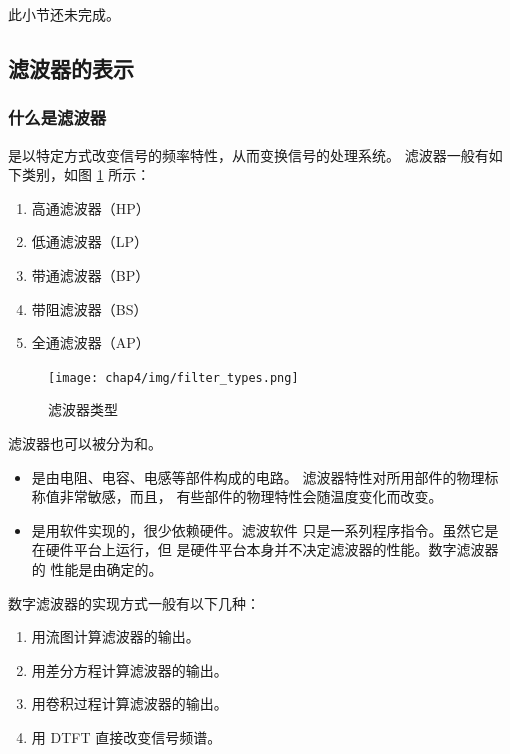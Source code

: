 \begin{note}
    此小节还未完成。
\end{note}

\subsection{滤波器的表示}

\subsubsection{什么是滤波器}

\begin{definition}
    是以特定方式改变信号的频率特性，从而变换信号的处理系统。
    滤波器一般有如下类别，如图 \ref{fig:filter-types} 所示：
    \begin{enumerate}[label=(\arabic*)]
        \item 高通滤波器（HP）
        \item 低通滤波器（LP）
        \item 带通滤波器（BP）
        \item 带阻滤波器（BS）
        \item 全通滤波器（AP）
    \end{enumerate}
    \begin{figure}[H]
        \centering
        \texttt{[image: chap4/img/filter\_types.png]}
        \caption{滤波器类型}
        \label{fig:filter-types}
    \end{figure}

    滤波器也可以被分为和。
    \begin{itemize}
        \item {}是由电阻、电容、电感等部件构成的电路。
            滤波器特性对所用部件的物理标称值非常敏感，而且，
            有些部件的物理特性会随温度变化而改变。
        \item {}是用软件实现的，很少依赖硬件。滤波软件
            只是一系列程序指令。虽然它是在硬件平台上运行，但
            是硬件平台本身并不决定滤波器的性能。数字滤波器的
            性能是由确定的。
    \end{itemize}
    数字滤波器的实现方式一般有以下几种：
    \begin{enumerate}
        \item 用流图计算滤波器的输出。
        \item 用差分方程计算滤波器的输出。
        \item 用卷积过程计算滤波器的输出。
        \item 用 DTFT 直接改变信号频谱。
    \end{enumerate}
\end{definition}

